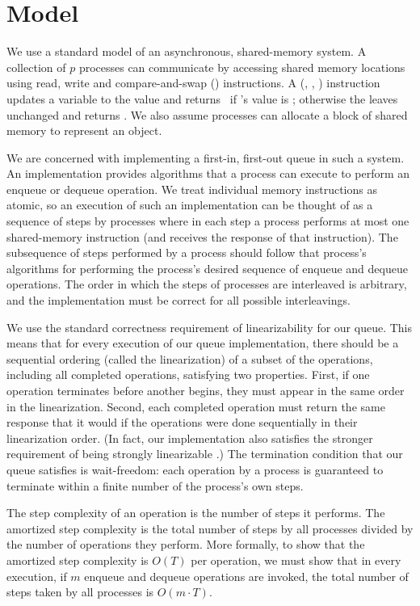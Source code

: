 
\section{Model}

We use a  standard model of an asynchronous, shared-memory system.
A collection of $p$ processes can communicate by accessing
shared memory locations using read, write and compare-and-swap () instructions.
A (, , ) instruction updates a variable  to the value  and returns \tr\ if 's value is ; otherwise the  leaves  unchanged and returns \fa.
We also assume processes can allocate a block of shared memory to represent an object.

We are concerned with implementing a first-in, first-out queue in such a system.
An implementation provides algorithms that a process can execute to perform
an enqueue or dequeue operation.
We treat individual memory instructions as atomic, so an execution
of such an implementation can be thought of as a sequence of steps by processes
where in each step a process performs at most one shared-memory instruction 
(and receives the response of that instruction).
The subsequence of steps performed by a process should follow that process's
algorithms for performing the process's desired sequence of enqueue and dequeue operations.
The order in which the steps of processes are interleaved is arbitrary, and the implementation must be correct for all
possible interleavings.

We use the standard correctness requirement of linearizability \cite{HW90} for 
our queue.  This means that for every execution of our queue implementation,
there should be a sequential ordering (called the linearization) of 
a subset of the operations, including all completed operations,
satisfying two properties.  First, if one operation terminates before another
begins, they must appear in the same order in the linearization.
Second, each completed operation must return the same response that it would
if the operations were done sequentially in their linearization order.
(In fact, our implementation also satisfies the stronger requirement of being
strongly linearizable \cite{GHW11}.)
The termination condition that our queue satisfies is wait-freedom:
each operation by a process is guaranteed to terminate within a finite number of the process's own steps.

The step complexity of an operation is the number of steps it performs.
The amortized step complexity is the total number of steps by all processes
divided by the number of operations they perform.
More formally, to show that the amortized step complexity is $O(T)$ per operation, we must show that in every execution, 
if $m$ enqueue and dequeue operations are invoked, the total number
of steps taken by all processes is $O(m\cdot T)$.



